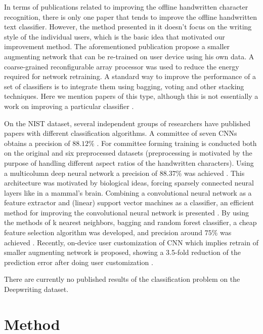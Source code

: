 \documentclass{article}
\begin{document}
In terms of publications related to improving the offline handwritten character recognition,
there is only one paper that tends to improve the offline handwritten text classifier.
However, the method presented in it doesn't focus on the writing style of the individual users, which is the basic idea that motivated our improvement method.
The aforementioned publication \citet{nist5} propose a smaller augmenting network that can be re-trained on user device using his own data. %
A coarse-grained reconfigurable array processor was used to reduce the energy required for network retraining.
A standard way to improve the performance of a set of classifiers is to integrate them using bagging, voting and other stacking techniques.
Here we mention papers of this type, although this is not essentially a work on improving a particular classifier \citet{imp1} \citet{imp2} \citet{imp3}.

On the NIST dataset, several independent groups of researchers have published papers with different classification algorithms.
A committee of seven CNNs obtains a precision of $88.12\%$ \citet{nist1}.
For committee forming training is conducted both on the original and six preprocessed datasets
(preprocessing is motivated by the purpose of handling different aspect ratios of the handwritten characters).
Using a multicolumn deep neural network a precision of $88.37\%$ was achieved \citet{nist2}.
This architecture was motivated by biological ideas, forcing sparsely connected neural layers like in a mammal's brain.
Combining a convolutional neural network as a feature extractor and (linear) support vector machines as a classifier,
an efficient method for improving the convolutional neural network is presented \cite{nist3}.
By using the methods of k nearest neighbors, bagging and random forest classifier, a cheap feature selection algorithm was developed,
and precision around $75\%$ was achieved \citet{nist4}.
Recently, on-device user customization of CNN which implies retrain of smaller augmenting network is proposed,
showing a 3.5-fold reduction of the prediction error after doing user customization \citet{nist5}.

There are currently no published results of the classification problem on the Deepwriting dataset.

\section{Method}
\end{document}
